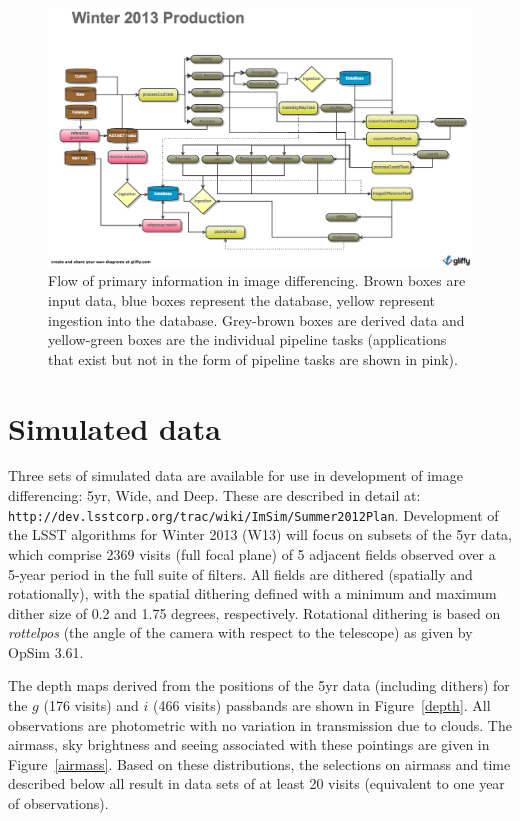 \documentclass[prd, nofootinbib, floatfix, 11pt,tightenlines,times]{article}
\begin{document}
\begin{figure}
\includegraphics[width=\textwidth]{Figures/Winter_2013.png}
\caption{Flow of primary information in image differencing. Brown
  boxes are input data, blue boxes represent the database, yellow
  represent ingestion into the database. Grey-brown boxes are derived
  data and yellow-green boxes are the individual pipeline tasks (applications
  that exist but not in the form of pipeline tasks are shown in pink).}
\label{flow}
\end{figure}

\clearpage 

\section{Simulated data} 

Three sets of simulated data are available for use in development of
image differencing: 5yr, Wide, and Deep. These are described in detail
at: \\ {\tt http://dev.lsstcorp.org/trac/wiki/ImSim/Summer2012Plan}.
Development of the LSST algorithms for Winter 2013 (W13) will focus on
subsets of the 5yr data, which comprise 2369 visits (full focal plane)
of 5 adjacent fields observed over a 5-year period in the full suite
of filters. All fields are dithered (spatially and rotationally), with the
spatial dithering defined with a minimum and maximum dither size of
0.2 and 1.75 degrees, respectively. Rotational dithering is based on
{\it rottelpos} (the angle of the camera with respect to the
telescope) as given by OpSim 3.61.

The depth maps derived from the positions of the 5yr data (including
dithers) for the $g$ (176 visits) and $i$ (466 visits) passbands are
shown in Figure~\ref{depth}. All observations are photometric with no
variation in transmission due to clouds. The airmass, sky brightness
and seeing associated with these pointings are given in
Figure~\ref{airmass}. Based on these distributions, the selections on
airmass and time described below all result in data sets of at least
20 visits (equivalent to one year of observations).
\end{document}
